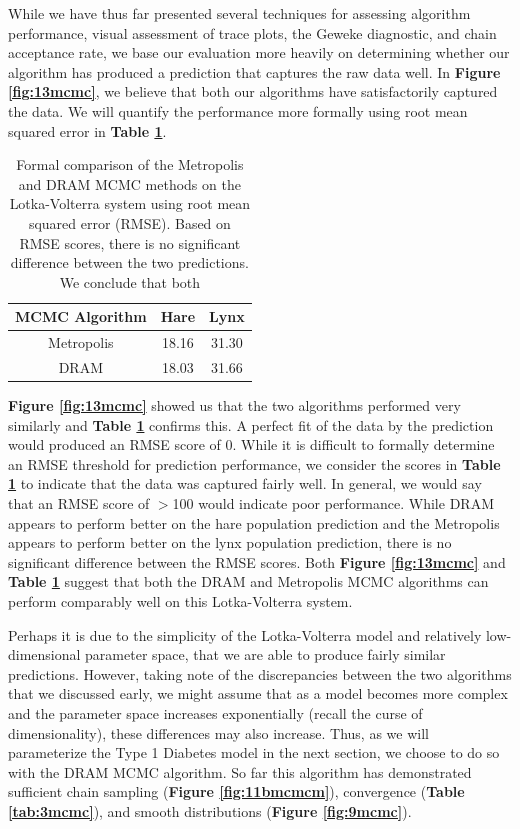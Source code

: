 \documentclass{article}
\begin{document}
\par While we have thus far presented several techniques for assessing algorithm performance, visual assessment of trace plots, the Geweke diagnostic, and chain acceptance rate, we base our evaluation more heavily on determining whether our algorithm has produced a prediction that captures the raw data well. In \textbf{Figure \ref{fig:13mcmc}}, we believe that both our algorithms have satisfactorily captured the data. We will quantify the performance more formally using root mean squared error in \textbf{Table \ref{tab:4mcmc}}.
\begin{table}[H]
\centering
        \begin{tabular}{c | c c}
            \cline{1-3}
            \textbf{MCMC Algorithm}  &\textbf{Hare} & \textbf{Lynx}\\
            \hline
            Metropolis & 18.16 & 31.30\\
            DRAM & 18.03 & 31.66
             \\\hline
            \hline
        \end{tabular}
    \caption{Formal comparison of the Metropolis and DRAM MCMC methods on the Lotka-Volterra system using root mean squared error (RMSE). Based on RMSE scores, there is no significant difference between the two predictions. We conclude that both}
    \label{tab:4mcmc}
\end{table}
\textbf{Figure \ref{fig:13mcmc}} showed us that the two algorithms performed very similarly and \textbf{Table \ref{tab:4mcmc}} confirms this. A perfect fit of the data by the prediction would produced an RMSE score of 0. While it is difficult to formally determine an RMSE threshold for prediction performance, we consider the scores in \textbf{Table \ref{tab:4mcmc}} to indicate that the data was captured fairly well. In general, we would say that an RMSE score of $>$100 would indicate poor performance. While DRAM appears to perform better on the hare population prediction and the Metropolis appears to perform better on the lynx population prediction, there is no significant difference between the RMSE scores. Both \textbf{Figure \ref{fig:13mcmc}} and \textbf{Table \ref{tab:4mcmc}} suggest that both the DRAM and Metropolis MCMC algorithms can perform comparably well on this Lotka-Volterra system.
\par Perhaps it is due to the simplicity of the Lotka-Volterra model and relatively low-dimensional parameter space, that we are able to produce fairly similar predictions. However, taking note of the discrepancies between the two algorithms that we discussed early, we might assume that as a model becomes more complex and the parameter space increases exponentially (recall the curse of dimensionality), these differences may also increase. Thus, as we will parameterize the Type 1 Diabetes model in the next section, we choose to do so with the DRAM MCMC algorithm. So far this algorithm has demonstrated sufficient chain sampling (\textbf{Figure \ref{fig:11bmcmcm}}), convergence (\textbf{Table \ref{tab:3mcmc}}), and smooth distributions (\textbf{Figure \ref{fig:9mcmc}}).
\end{document}
